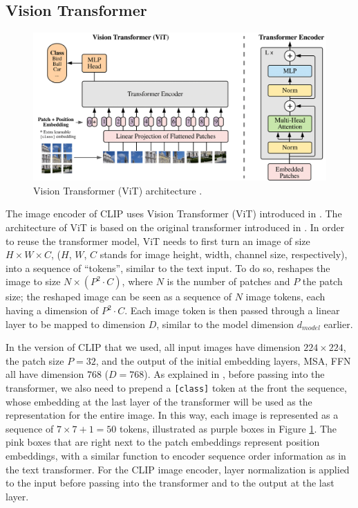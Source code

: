 \subsection{Vision Transformer}
\begin{figure}[!htb]
\centering
\includegraphics[width=0.7\linewidth]{modeling/visionTransformer.png}  
\caption{Vision Transformer (ViT) architecture \citep{ViT}.}
\label{modeling.visionTransformer}
\end{figure}

The image encoder of CLIP uses Vision Transformer (ViT) introduced in \cite{ViT}. The architecture of ViT is based on the original transformer introduced in \cite{attentionAllYouNeed}. 
In order to reuse the transformer model, ViT needs to first turn an image of size $H\times W \times C$, ($H$, $W$, $C$ stands for image height, width, channel size, respectively), into a sequence of ``tokens'', similar to the text input.  
To do so, \cite{ViT} reshapes the image to size $N \times (P^2 \cdot C)$, where $N$ is the number of patches and $P$ the patch size; the reshaped image can be seen as a sequence of $N$ image tokens, each having a dimension of $P^2 \cdot C$. Each image token is then passed through a linear layer to be mapped to dimension $D$, similar to the model dimension $d_{model}$ earlier. 

In the version of CLIP that we used, all input images have dimension $224\times 224$, the patch size $P = 32$, and the output of the initial embedding layers, MSA, FFN all have dimension $768$ ($D = 768$). 
As explained in \cite{ViT}, before passing into the transformer, we also need to prepend a \texttt{[class]} token at the front the sequence, whose embedding at the last layer of the transformer will be used as the representation for the entire image. In this way, each image is represented as a sequence of $7\times 7 + 1 = 50$ tokens, illustrated as purple boxes in Figure \ref{modeling.visionTransformer}. The pink boxes that are right next to the patch embeddings represent position embeddings, with a similar function to encoder sequence order information as in the text transformer. 
For the CLIP image encoder, layer normalization is applied to the input before passing into the transformer and to the output at the last layer.
 

